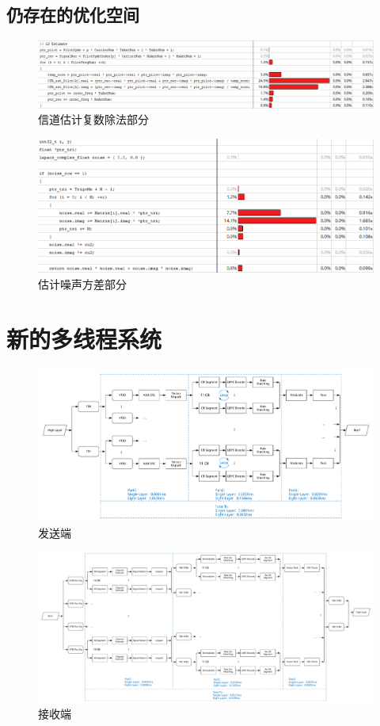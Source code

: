 \documentclass{article}
\begin{document}
\subsection{仍存在的优化空间}
\begin{figure}[H]
	\centering
	\includegraphics[width = .8\textwidth]{part1.png}
	\caption{信道估计复数除法部分}
\end{figure}
\begin{figure}[H]
	\centering
	\includegraphics[width = .8\textwidth]{part2.png}
	\caption{估计噪声方差部分}
\end{figure}
\section{新的多线程系统}
\begin{figure}[H]
	\centering
	\includegraphics[width = \textwidth]{txstr.pdf}
	\caption{发送端}
\end{figure}
\begin{figure}[H]
	\centering
	\includegraphics[width = \textwidth]{rxstr.pdf}
	\caption{接收端}
\end{figure}
\end{document}
